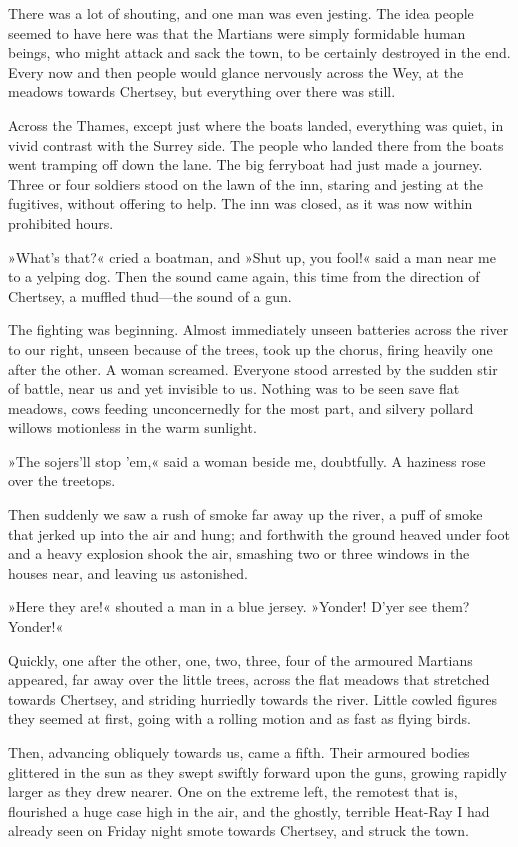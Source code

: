 There was a lot of shouting, and one man was even jesting. The idea people seemed to have here was that the Martians were simply formidable human beings, who might attack and sack the town, to be certainly destroyed in the end. Every now and then people would glance nervously across the Wey, at the meadows towards Chertsey, but everything over there was still.

Across the Thames, except just where the boats landed, everything was quiet, in vivid contrast with the Surrey side. The people who landed there from the boats went tramping off down the lane. The big ferryboat had just made a journey. Three or four soldiers stood on the lawn of the inn, staring and jesting at the fugitives, without offering to help. The inn was closed, as it was now within prohibited hours.

»What's that?« cried a boatman, and »Shut up, you fool!« said a man near me to a yelping dog. Then the sound came again, this time from the direction of Chertsey, a muffled thud—the sound of a gun.

The fighting was beginning. Almost immediately unseen batteries across the river to our right, unseen because of the trees, took up the chorus, firing heavily one after the other. A woman screamed. Everyone stood arrested by the sudden stir of battle, near us and yet invisible to us. Nothing was to be seen save flat meadows, cows feeding unconcernedly for the most part, and silvery pollard willows motionless in the warm sunlight.

»The sojers'll stop 'em,« said a woman beside me, doubtfully. A haziness rose over the treetops.

Then suddenly we saw a rush of smoke far away up the river, a puff of smoke that jerked up into the air and hung; and forthwith the ground heaved under foot and a heavy explosion shook the air, smashing two or three windows in the houses near, and leaving us astonished.

»Here they are!« shouted a man in a blue jersey. »Yonder! D'yer see them? Yonder!«

Quickly, one after the other, one, two, three, four of the armoured Martians appeared, far away over the little trees, across the flat meadows that stretched towards Chertsey, and striding hurriedly towards the river. Little cowled figures they seemed at first, going with a rolling motion and as fast as flying birds.

Then, advancing obliquely towards us, came a fifth. Their armoured bodies glittered in the sun as they swept swiftly forward upon the guns, growing rapidly larger as they drew nearer. One on the extreme left, the remotest that is, flourished a huge case high in the air, and the ghostly, terrible Heat-Ray I had already seen on Friday night smote towards Chertsey, and struck the town.

